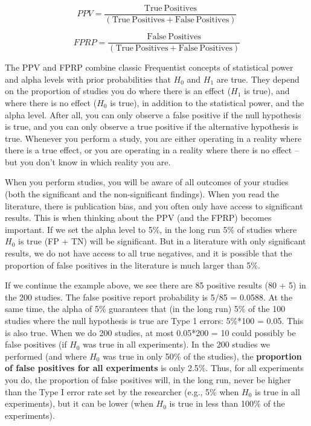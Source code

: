 \documentclass[
  oneside]{book}
\begin{document}
\[PPV = \frac{\text{True}\ \text{Positives}}{(\text{True}\ \text{Positives} +
                                                \text{False}\ \text{Positives})}\]

\[FPRP = \frac{\text{False}\ \text{Positives}}{(\text{True}\ \text{Positives}
                                                  + \text{False}\ \text{Positives})}\]

The PPV and FPRP combine classic Frequentist concepts of statistical power and alpha levels with prior probabilities that \(H_0\) and \(H_1\) are true. They depend on the proportion of studies you do where there is an effect (\(H_1\) is true), and where there is no effect (\(H_0\) is true), in addition to the statistical power, and the alpha level. After all, you can only observe a false positive if the null hypothesis is true, and you can only observe a true positive if the alternative hypothesis is true. Whenever you perform a study, you are either operating in a reality where there is a true effect, or you are operating in a reality where there is no effect -- but you don't know in which reality you are.

When you perform studies, you will be aware of all outcomes of your studies (both the significant and the non-significant findings). When you read the literature, there is publication bias, and you often only have access to significant results. This is when thinking about the PPV (and the FPRP) becomes important. If we set the alpha level to 5\%, in the long run 5\% of studies where \(H_0\) is true (FP + TN) will be significant. But in a literature with only significant results, we do not have access to all true negatives, and it is possible that the proportion of false positives in the literature is much larger than 5\%.

If we continue the example above, we see there are 85 positive results (80 + 5) in the 200 studies. The false positive report probability is 5/85 = 0.0588. At the same time, the alpha of 5\% guarantees that (in the long run) 5\% of the 100 studies where the null hypothesis is true are Type 1 errors: 5\%*100 = 0.05. This is also true. When we do 200 studies, at most 0.05*200 = 10 could possibly be false positives (if \(H_0\) was true in all experiments). In the 200 studies we performed (and where \(H_0\) was true in only 50\% of the studies), the \textbf{proportion of false positives for all experiments} is only 2.5\%. Thus, for all experiments you do, the proportion of false positives will, in the long run, never be higher than the Type I error rate set by the researcher (e.g., 5\% when \(H_0\) is true in all experiments), but it can be lower (when \(H_0\) is true in less than 100\% of the experiments).
\end{document}
